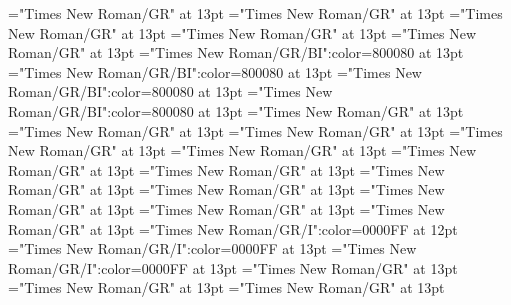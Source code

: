 \documentclass[a4paper]{article}
\begin{document}
\font\spanenpronunciationggofonipaxemicpronunciationsentryletDatadicBody="Times New Roman/GR" at 13pt
\font\spanggofonipaxemicpronunciationggofonipaxemicpronunciationsentryletDatadicBody="Times New Roman/GR" at 13pt
\font\spanenpronunciationsentryletDatadicBody="Times New Roman/GR" at 13pt
\font\sensesentryletDatadicBody="Times New Roman/GR" at 13pt
\font\sensesensesentryletDatadicBody="Times New Roman/GR" at 13pt
\font\grammaticalinfosensesensesentryletDatadicBody="Times New Roman/GR/BI":color=800080 at 13pt
\font\partofspeechengrammaticalinfosensesensesentryletDatadicBody="Times New Roman/GR/BI":color=800080 at 13pt
\font\spanenpartofspeechengrammaticalinfosensesensesentryletDatadicBody="Times New Roman/GR/BI":color=800080 at 13pt
\font\spanengrammaticalinfosensesensesentryletDatadicBody="Times New Roman/GR/BI":color=800080 at 13pt
\font{}="Times New Roman/GR" at 13pt
\font\spanendefinitionensensesensesentryletDatadicBody="Times New Roman/GR" at 13pt
\font\LexSensepublishStemDefinitionPubensensesensesentryletDatadicBody="Times New Roman/GR" at 13pt
\font\spanenLexSensepublishStemDefinitionPubensensesensesentryletDatadicBody="Times New Roman/GR" at 13pt
\font\LexSensepublishStemGlossPubLcensensesensesentryletDatadicBody="Times New Roman/GR" at 13pt
\font\xitemenLexSensepublishStemGlossPubLcensensesensesentryletDatadicBody="Times New Roman/GR" at 13pt
\font\spanenxitemenLexSensepublishStemGlossPubLcensensesensesentryletDatadicBody="Times New Roman/GR" at 13pt
\font\xitemhiLexSensepublishStemGlossPubLcensensesensesentryletDatadicBody="Times New Roman/GR" at 13pt
\font\spanhixitemhiLexSensepublishStemGlossPubLcensensesensesentryletDatadicBody="Times New Roman/GR" at 13pt
\font\xitemteLexSensepublishStemGlossPubLcensensesensesentryletDatadicBody="Times New Roman/GR" at 13pt
\font\spantexitemteLexSensepublishStemGlossPubLcensensesensesentryletDatadicBody="Times New Roman/GR" at 13pt
\font\examplessensesensesentryletDatadicBody="Times New Roman/GR" at 13pt
\font\exampleggoTeluINexamplessensesensesentryletDatadicBody="Times New Roman/GR/I":color=0000FF at 12pt
\font\spanggoTeluINexampleggoTeluINexamplessensesensesentryletDatadicBody="Times New Roman/GR/I":color=0000FF at 13pt
\font\spanenexampleggoTeluINexamplessensesensesentryletDatadicBody="Times New Roman/GR/I":color=0000FF at 13pt
\font\translationsexamplessensesensesentryletDatadicBody="Times New Roman/GR" at 13pt
\font\CmTranslationpublishStemTypeConfigtranslationsexamplessensesensesentryletDatadicBody="Times New Roman/GR" at 13pt
\font\CmPossibilitypublishStemTransTypeAbbreviationPubenCmTranslationpublishStemTypeConfigtranslationsexamplessensesensesentryletDatadicBody="Times New Roman/GR" at 13pt
\end{document}

